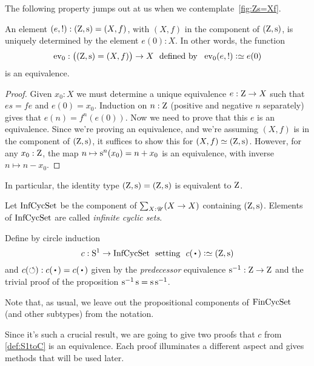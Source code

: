 The following property jumps out at us when we contemplate~\cref{fig:Zs=Xf}.
\begin{lemma}
  \label{lem:IdCisZet}
  An element $(e,!) : (\zet,\zs)=(X,f)$, with $(X,f)$ in the component of $(\zet,\zs)$,
  is uniquely determined by the element $e(0):X$.
  In other words, the function
  \[
    \ev_0:\bigl((\zet,\zs)=(X,f)\bigr)\to X
    \text{~~defined by~~} \ev_0(e,!) \defeq e(0)
  \]
  is an equivalence.
\end{lemma}
\begin{proof}
  Given $x_0:X$ we must determine a unique equivalence $e:\mathrm{Z}\to X$
  such that $es=fe$ and $e(0)=x_0$.
  Induction on $n:\mathrm{Z}$ (positive and negative $n$ separately)
  gives that $e(n)=f^n(e(0))$.
  Now we need to prove that this $e$ is an equivalence.
  Since we're proving an equivalence, and we're assuming $(X,f)$ is in the component
  of $(\zet,\zs)$, it suffices to show this for $(X,f)\jdeq(\zet,\zs)$.
  However, for any $x_0:\mathrm{Z}$,
  the map $n \mapsto \zs^n(x_0) = n + x_0$ is an equivalence,
  with inverse $n \mapsto n - x_0$.
\end{proof}
In particular, the identity type $(\zet,\zs)=(\zet,\zs)$ is equivalent to $\mathrm{Z}$.

\begin{definition}\label{def:S1toC}
  Let $\mathrm{InfCycSet}$ be the component of $\sum_{X:{\mathscr{U}}}(X\to X)$ containing $(\zet,\zs)$.
  Elements of $\mathrm{InfCycSet}$ are called \emph{infinite cyclic sets}.

  Define by circle induction
  \[
    c:\Sc\to\InfCycSet \text{~~setting~~}
    c(\base)\defequi (\zet,\zs)
  \]
  and $c(\Sloop): c(\base)= c(\base)$ given by the \emph{predecessor} equivalence
  $\zs^{-1}:\zet\to\zet$
  and the trivial proof of the proposition $\zs^{-1}\zs=\zs\zs^{-1}$.
\end{definition}

Note that, as usual, we leave out the propositional components of $\mathrm{FinCycSet}$ (and other subtypes) from the notation.

Since it's such a crucial result, we are going to give two proofs that $c$ from \cref{def:S1toC} is an equivalence.
Each proof illuminates a different aspect and gives methods that will be used later.

